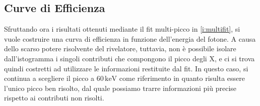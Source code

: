 \documentclass[twocolumn,10pt]{asme2ej}
\begin{document}
\subsection{Curve di Efficienza}

Sfruttando ora i risultati ottenuti mediante il fit multi-picco in \autoref{i:multifit}, si vuole costruire una curva di
efficienza in funzione dell'energia del fotone. A causa dello scarso potere risolvente del rivelatore, tuttavia, non è
possibile isolare dall'istogramma i singoli contributi che compongono il picco degli X, e ci si trova quindi costretti
ad utilizzare le informazioni restituite dal fit. In questo caso, si continua a scegliere il picco a
$60\,\si{\kilo\electronvolt}$ come riferimento in quanto risulta essere l'unico picco ben risolto, dal quale possiamo
trarre informazioni più precise rispetto ai contributi non risolti. 
\end{document}
